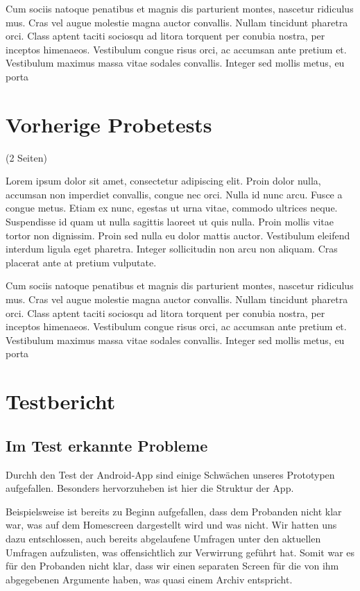 Cum sociis natoque penatibus et magnis dis parturient montes, nascetur ridiculus mus. Cras vel augue molestie magna auctor convallis. Nullam tincidunt pharetra orci. Class aptent taciti sociosqu ad litora torquent per conubia nostra, per inceptos himenaeos. Vestibulum congue risus orci, ac accumsan ante pretium et. Vestibulum maximus massa vitae sodales convallis. Integer sed mollis metus, eu porta

\clearpage
\section{Vorherige Probetests}
\label{sec:probetests}

(2 Seiten)

Lorem ipsum dolor sit amet, consectetur adipiscing elit. Proin dolor nulla, accumsan non imperdiet convallis, congue nec orci. Nulla id nunc arcu. Fusce a congue metus. Etiam ex nunc, egestas ut urna vitae, commodo ultrices neque. Suspendisse id quam ut nulla sagittis laoreet ut quis nulla. Proin mollis vitae tortor non dignissim. Proin sed nulla eu dolor mattis auctor. Vestibulum eleifend interdum ligula eget pharetra. Integer sollicitudin non arcu non aliquam. Cras placerat ante at pretium vulputate.

Cum sociis natoque penatibus et magnis dis parturient montes, nascetur ridiculus mus. Cras vel augue molestie magna auctor convallis. Nullam tincidunt pharetra orci. Class aptent taciti sociosqu ad litora torquent per conubia nostra, per inceptos himenaeos. Vestibulum congue risus orci, ac accumsan ante pretium et. Vestibulum maximus massa vitae sodales convallis. Integer sed mollis metus, eu porta

\clearpage
\section{Testbericht}
\label{sec:testbericht}

\subsection{Im Test erkannte Probleme}
\label{sec:foundproblemes}

Durchh den Test der Android-App sind einige Schwächen unseres Prototypen aufgefallen. Besonders hervorzuheben ist hier die Struktur der App.

Beispielsweise ist bereits zu Beginn aufgefallen, dass dem Probanden nicht klar war, was auf dem Homescreen dargestellt wird und was nicht. Wir hatten uns dazu entschlossen, auch bereits abgelaufene Umfragen unter den aktuellen Umfragen aufzulisten, was offensichtlich zur Verwirrung geführt hat. Somit war es für den Probanden nicht klar, dass wir einen separaten Screen für die von ihm abgegebenen Argumente haben, was quasi einem Archiv entspricht.

